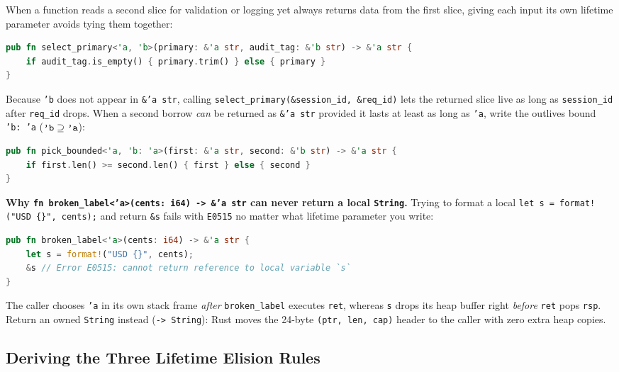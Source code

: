 When a function reads a second slice for validation or logging yet always returns data from the first slice, giving each input its own lifetime parameter avoids tying them together:

\begin{lstlisting}[language=Rust]
pub fn select_primary<'a, 'b>(primary: &'a str, audit_tag: &'b str) -> &'a str {
    if audit_tag.is_empty() { primary.trim() } else { primary }
}
\end{lstlisting}

Because \texttt{'b} does not appear in \texttt{\&'a str}, calling \texttt{select\_primary(\&session\_id, \&req\_id)} lets the returned slice live as long as \texttt{session\_id} after \texttt{req\_id} drops. When a second borrow \emph{can} be returned as \texttt{\&'a str} provided it lasts at least as long as \texttt{'a}, write the outlives bound \texttt{'b:\ 'a} ($\text{\texttt{'b}} \supseteq \text{\texttt{'a}}$):

\begin{lstlisting}[language=Rust]
pub fn pick_bounded<'a, 'b: 'a>(first: &'a str, second: &'b str) -> &'a str {
    if first.len() >= second.len() { first } else { second }
}
\end{lstlisting}

\begin{trapbox}
\textbf{Why \texttt{fn broken\_label<'a>(cents:\ i64) -> \&'a str} can never return a local \texttt{String}.} Trying to format a local \texttt{let s = format!("USD \{\}", cents);} and return \texttt{\&s} fails with \texttt{E0515} no matter what lifetime parameter you write:
\begin{lstlisting}[language=Rust]
pub fn broken_label<'a>(cents: i64) -> &'a str {
    let s = format!("USD {}", cents);
    &s // Error E0515: cannot return reference to local variable `s`
}
\end{lstlisting}
The caller chooses \texttt{'a} in its own stack frame \emph{after} \texttt{broken\_label} executes \texttt{ret}, whereas \texttt{s} drops its heap buffer right \emph{before} \texttt{ret} pops \texttt{rsp}. Return an owned \texttt{String} instead (\texttt{-> String}): Rust moves the 24-byte \texttt{(ptr, len, cap)} header to the caller with zero extra heap copies.
\end{trapbox}

\subsection{Deriving the Three Lifetime Elision Rules}
\label{ch04:three-elision-rules}

